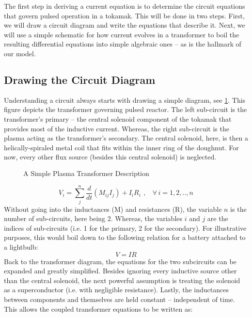 The first step in deriving a current equation is to determine the circuit equations that govern pulsed operation in a tokamak. This will be done in two steps. First, we will draw a circuit diagram and write the equations that describe it. Next, we will use a simple schematic for how current evolves in a transformer to boil the resulting differential equations into simple algebraic ones -- as is the hallmark of our model.

\subsection{Drawing the Circuit Diagram}

Understanding a circuit always starts with drawing a simple diagram, see \cref{fig:circuit_diagram}. This figure depicts the transformer governing pulsed reactor. The left sub-circuit is the transformer's primary -- the central solenoid component of the tokamak that provides most of the inductive current. Whereas, the right sub-circuit is the plasma acting as the transformer's secondary. The central solenoid, here, is then a helically-spiraled metal coil that fits within the inner ring of the doughnut. For now, every other flux source (besides this central solenoid) is neglected.

\begin{figure}[]
\centering

\caption{A Simple Plasma Transformer Description}
\label{fig:circuit_diagram}
\end{figure}

\begin{equation}
	V_i = \sum_j^n \frac{d}{dt} \left( M_{ij} I_j \right) + I_i R_i \ \, , \ \ \ \ \forall \, i = 1,2,..,n
\end{equation}
Without going into the inductances (M) and resistances (R), the variable $n$ is the number of sub-circuits, here being 2. Whereas, the variables $i$ and $j$ are the indices of sub-circuits (i.e. 1 for the primary, 2 for the secondary). For illustrative purposes, this would boil down to the following relation for a battery attached to a lightbulb:
\begin{equation}
	V = I R
\end{equation}
Back to the transformer diagram, the equations for the two subcircuits can be expanded and greatly simplified. Besides ignoring every inductive source other than the central solenoid, the next powerful assumption is treating the solenoid as a superconductor (i.e. with negligible resistance). Lastly, the inductances between components and themselves are held constant -- independent of time. This allows the coupled transformer equations to be written as:

